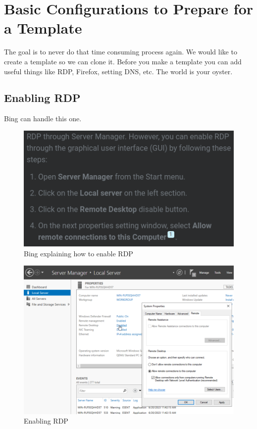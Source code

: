 \documentclass{article}
\begin{document}
\section{Basic Configurations to Prepare for a Template}
The goal is to never do that time consuming process again. We would like to create a template so we can clone it. Before you make a template you can add useful things like RDP, Firefox, setting DNS, etc. The world is your oyster.

\subsection{Enabling RDP}

Bing can handle this one.

\begin{figure}[H]
    \centering
    \includegraphics[width=1\textwidth]{bingDirectionsForEnableRDP.png}
    \caption{Bing explaining how to enable RDP}
    \label{fig:bingDirectionsForEnableRDP}
\end{figure}

\begin{figure}[H]
    \centering
    \includegraphics[width=1\textwidth]{enableRDP.png}
    \caption{Enabling RDP}
    \label{fig:enableRDP}
\end{figure}
\end{document}
